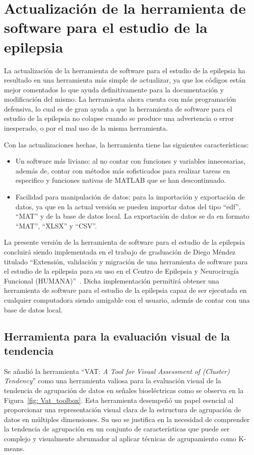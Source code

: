 \chapter{Actualización de la herramienta de software para el estudio de la epilepsia}
La actualización de la herramienta de software para el estudio de la epilepsia ha resultado en una herramienta más simple de actualizar, ya que los códigos están mejor comentados lo que ayuda definitivamente para la documentación y modificación del mismo. La herramienta ahora cuenta con más programación defensiva, lo cual es de gran ayuda a que la herramienta de software para el estudio de la epilepsia no colapse cuando se produce una advertencia o error inesperado, o por el mal uso de la misma herramienta.

Con las actualizaciones hechas, la herramienta tiene las siguientes características:
\begin{itemize}
    \item Un software más liviano: al no contar con funciones y variables innecesarias, además de, contar con métodos más sofisticados para realizar tareas en especifico y funciones nativas de MATLAB que se han descontinuado. 
    \item Facilidad para manipulación de datos: para la importación y exportación de datos, ya que en la actual versión se pueden importar datos del tipo ``edf'', ``MAT'' y de la base de datos local. La exportación de datos se da en formato ``MAT'', ``XLSX'' y ``CSV''.
\end{itemize}

La presente versión de la herramienta de software para el estudio de la epilepsia concluirá siendo implementada en el trabajo de graduación de Diego Méndez titulado ``Extensión, validación y migración de una herramienta
de software para el estudio de la epilepsia para su uso en el Centro de Epilepsia y Neurocirugía Funcional (HUMANA)''~\cite{diego_2023}. Dicha implementación permitirá obtener una herramienta de software para el estudio de la epilepsia capaz de ser ejecutada en cualquier computadora siendo amigable con el usuario, además de contar con una base de datos local.  


\section{Herramienta para la evaluación visual de la tendencia}
Se añadió la herramienta ``VAT: \textit{ A Tool for Visual Assessment of (Cluster) Tendency}'' como una herramienta valiosa para la evaluación visual de la tendencia de agrupación de datos en señales bioeléctricas como se observa en la Figura~\ref{fig: Vat_toolbox}. Esta herramienta desempeñó un papel esencial al proporcionar una representación visual clara de la estructura de agrupación de datos en múltiples dimensiones. Su uso se justifica en la necesidad de comprender la tendencia de agrupación en un conjunto de características que puede ser complejo y visualmente abrumador al aplicar técnicas de agrupamiento como K-means.


